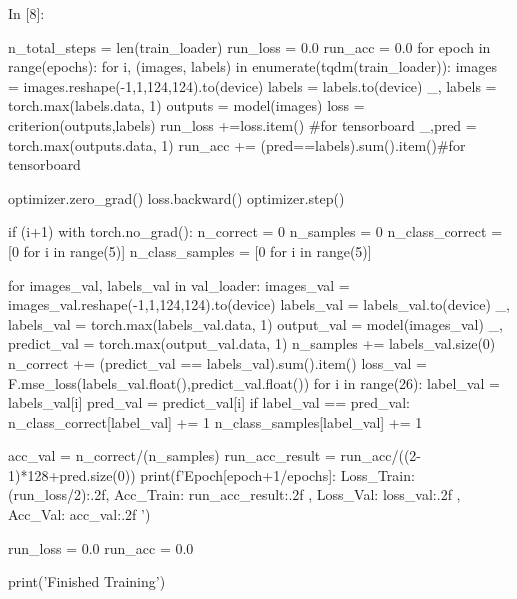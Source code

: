 \documentclass[12pt, a4paper]{article}
\begin{document}
\begin{python}
In [8]:

n_total_steps = len(train_loader)
run_loss = 0.0
run_acc = 0.0
for epoch in range(epochs):
    for i, (images, labels) in enumerate(tqdm(train_loader)):
        images = images.reshape(-1,1,124,124).to(device)
        labels = labels.to(device)
        _, labels = torch.max(labels.data, 1)
        outputs = model(images)
        loss = criterion(outputs,labels)
        run_loss +=loss.item() #for tensorboard
        _,pred = torch.max(outputs.data, 1)
        run_acc += (pred==labels).sum().item()#for tensorboard
        
        optimizer.zero_grad()
        loss.backward()
        optimizer.step()
        
        if (i+1) %
            with torch.no_grad():
                n_correct = 0
                n_samples = 0
                n_class_correct = [0 for i in range(5)]
                n_class_samples = [0 for i in range(5)]
                
                for images_val, labels_val in val_loader:
                    images_val = images_val.reshape(-1,1,124,124).to(device)
                    labels_val = labels_val.to(device)
                    _, labels_val = torch.max(labels_val.data, 1)
                    output_val = model(images_val)
                    _, predict_val = torch.max(output_val.data, 1)
                    n_samples += labels_val.size(0)
                    n_correct += (predict_val == labels_val).sum().item()
                    loss_val = F.mse_loss(labels_val.float(),predict_val.float())
                    for i in range(26):
                        label_val = labels_val[i]
                        pred_val = predict_val[i]
                        if label_val == pred_val:
                            n_class_correct[label_val] += 1
                        n_class_samples[label_val] += 1
                        
                acc_val = n_correct/(n_samples)  
                run_acc_result = run_acc/((2-1)*128+pred.size(0))
                print(f'Epoch[{epoch+1}/{epochs}]:  Loss_Train: {(run_loss/2):.2f}, Acc_Train: {run_acc_result:.2f} , Loss_Val: {loss_val:.2f} , Acc_Val: {acc_val:.2f} ')
            
            run_loss = 0.0
            run_acc = 0.0

print('Finished Training')
\end{python}
\newpage
\end{document}
